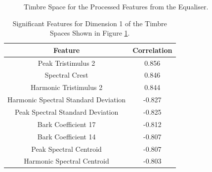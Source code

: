 	\begin{figure}[h!]
		\centering
		\qquad
		\caption{Timbre Space for the Processed Features from the Equaliser.}
		\label{fig:EqualiserProcessedMDSs}
	\end{figure}

	\begin{table}[h!]
		\centering
		\begin{tabular}{|c|c|}
			\hline
			\bf{Feature} & \bf{Correlation} \\
			\hline
			\hline
			Peak Tristimulus 2 &  0.856 \\
			\hline
			Spectral Crest &  0.846 \\
			\hline
			Harmonic Tristimulus 2 &  0.844 \\
			\hline
			Harmonic Spectral Standard Deviation & -0.827 \\
			\hline
			Peak Spectral Standard Deviation & -0.825 \\
			\hline
			Bark Coefficient 17 & -0.812 \\
			\hline
			Bark Coefficient 14 & -0.807 \\
			\hline
			Peak Spectral Centroid & -0.807 \\
			\hline
			Harmonic Spectral Centroid & -0.803 \\
			\hline
		\end{tabular}
		\caption{Significant Features for Dimension 1 of the Timbre Spaces Shown in Figure 
			 \ref{fig:EqualiserProcessedMDSs}.}
		\label{tab:EqualiserProcessedFeaturesDim1}
	\end{table}

